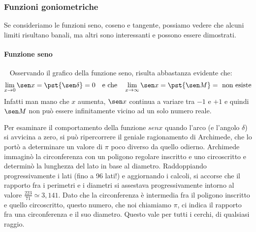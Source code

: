 \subsubsection{Funzioni goniometriche}

Se consideriamo le funzioni seno, coseno e tangente, possiamo vedere che 
alcuni limiti risultano banali, ma altri sono interessanti e possono essere 
dimostrati.

\begin{minipage}{.66\textwidth}
\begin{center} \sinusoide \end{center}
\begin{center} \cosinusoide \end{center}
\end{minipage}
\hfill
\begin{minipage}{.33\textwidth}
\begin{center} \tangentoide \end{center}
\end{minipage}

\paragraph{Funzione seno}~
\label{limiti:par_f_seno}
Osservando il grafico della funzione seno, risulta abbastanza evidente che:
\[\lim_{x \rightarrow 0}{\sen x} = \pst{\sen \delta} = 0
\quad \text{e che} \quad 
\lim_{x \rightarrow \infty}{\sen x} = \pst{\sen M} = \text{ non esiste}\]
Infatti man mano che \(x\) aumenta, \(\sen x\)
continua a variare tra \(-1\) e \(+1\) e quindi 
\(\sen M\) non può essere infinitamente vicino ad un solo numero reale.

Per esaminare il comportamento della funzione \(sen x\) quando l'arco (e 
l'angolo \(\delta\)) si avvicina a zero, si può ripercorrere il geniale 
ragionamento di Archimede, che lo portò a determinare un valore di \(\pi\) 
poco diverso da quello odierno. Archimede immaginò la circonferenza con un 
poligono regolare inscritto e uno circoscritto e determinò la lunghezza del 
lato in base al diametro. Raddoppiando progressivamente i lati (fino a 96 
lati!) e aggiornando i calcoli, si accorse che il rapporto fra i perimetri e i 
diametri si assestava progressivamente intorno al valore 
\(\frac{223}{71}\simeq 3,141\). Dato che la circonferenza è intermedia fra il 
poligono inscritto e quello circoscritto, questo numero, che noi chiamiamo 
\(\pi\), ci indica il rapporto fra una circonferenza e il 
suo diametro. Questo vale per tutti i cerchi, di qualsiasi raggio.

